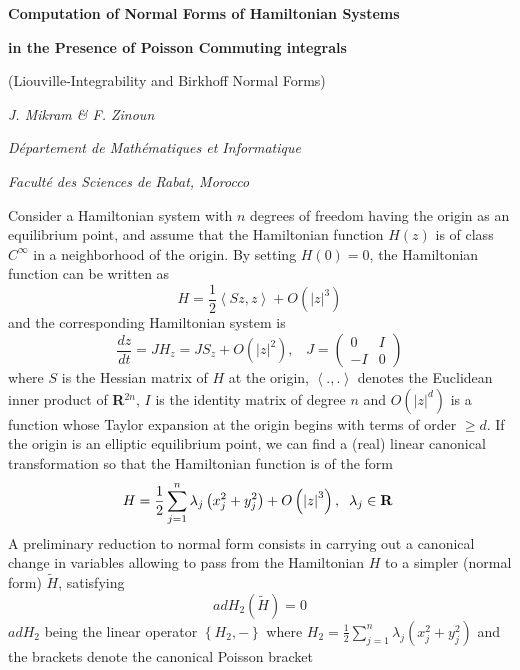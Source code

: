\documentclass[11pt,thmsa]{article}
\newcommand{\R}{\mbox{\rm\bf R}} %
\begin{document}
\begin{center}
\textbf{Computation of Normal Forms of Hamiltonian Systems}

\textbf{in the Presence of Poisson Commuting integrals}

(Liouville-Integrability and Birkhoff Normal Forms)\\[0.2cm]
\end{center}

\begin{center}
\textit{J. Mikram \& F. Zinoun}

\textit{D\'epartement de Math\'ematiques et Informatique}

\textit{Facult\'e des Sciences de Rabat, Morocco}\\[1cm]
\end{center}
Consider a Hamiltonian system with $n$ degrees of freedom having the
origin as an equilibrium point, and assume that the Hamiltonian function $%
H(z)$ is of class $C^\infty $ in a neighborhood of the origin. By setting $%
H(0)=0$, the Hamiltonian function can be written as 
\[
H=\frac 12\left\langle Sz,z\right\rangle +O\left( \left| z\right| ^3\right) 
\]
and the corresponding Hamiltonian system is 
\begin{equation}
\frac{dz}{dt}=JH_z=JS_z+O\left( \left| z\right| ^2\right) ,\;\;\;J=\left( 
\begin{array}{cc}
0 & I \\ 
-I & 0
\end{array}
\right) 
\end{equation}
where $S$ is the Hessian matrix of $H$ at the origin, $\left\langle
.,.\right\rangle $ denotes the Euclidean inner product of {\R}$^{2n}$, $I$
is the identity matrix of degree $n$ and $O\left( \left| z\right| ^d\right) $
is a function whose Taylor expansion at the origin begins with terms of
order $\geq d$. If the origin is an elliptic equilibrium point, we can find
a (real) linear canonical transformation so that the Hamiltonian function is
of the form 
\[
H=\frac 12\sum\limits_{j=1}^n\lambda _j\left( x_j^2+y_j^2\right) +O\left(
\left| z\right| ^3\right) ,\;\;\lambda _j\in \R\
\]
A preliminary reduction to normal form consists in carrying out a canonical
change in variables allowing to pass from the Hamiltonian $H$ to a simpler
(normal form) $\widetilde{H}$, satisfying 
\[
adH_2\left( \widetilde{H}\right) =0
\]
$adH_2$ being the linear operator $\left\{ H_2,-\right\} $ where $H_2=\frac
12\sum\limits_{j=1}^n\lambda _j\left( x_j^2+y_j^2\right) $ and the brackets
denote the canonical Poisson bracket 
\end{document}
